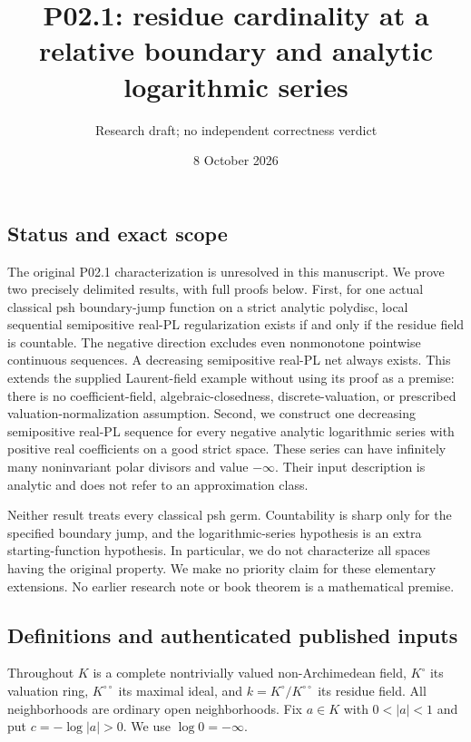 \documentclass[
  11pt,
]{article}
\title{P02.1: residue cardinality at a relative boundary and analytic
logarithmic series}
\author{Research draft; no independent correctness verdict}
\date{8 October 2026}
\begin{document}
\maketitle

\subsection{Status and exact scope}\label{status-and-exact-scope}

The original P02.1 characterization is unresolved in this manuscript. We
prove two precisely delimited results, with full proofs below. First,
for one actual classical psh boundary-jump function on a strict analytic
polydisc, local sequential semipositive real-PL regularization exists if
and only if the residue field is countable. The negative direction
excludes even nonmonotone pointwise continuous sequences. A decreasing
semipositive real-PL net always exists. This extends the supplied
Laurent-field example without using its proof as a premise: there is no
coefficient-field, algebraic-closedness, discrete-valuation, or
prescribed valuation-normalization assumption. Second, we construct one
decreasing semipositive real-PL sequence for every negative analytic
logarithmic series with positive real coefficients on a good strict
space. These series can have infinitely many noninvariant polar divisors
and value \(-\infty\). Their input description is analytic and does not
refer to an approximation class.

Neither result treats every classical psh germ. Countability is sharp
only for the specified boundary jump, and the logarithmic-series
hypothesis is an extra starting-function hypothesis. In particular, we
do not characterize all spaces having the original property. We make no
priority claim for these elementary extensions. No earlier research note
or book theorem is a mathematical premise.

\subsection{Definitions and authenticated published
inputs}\label{definitions-and-authenticated-published-inputs}

Throughout \(K\) is a complete nontrivially valued non-Archimedean
field, \(K^\circ\) its valuation ring, \(K^{\circ\circ}\) its maximal
ideal, and \(k=K^\circ/K^{\circ\circ}\) its residue field. All
neighborhoods are ordinary open neighborhoods. Fix \(a\in K\) with
\(0<|a|<1\) and put \(c=-\log|a|>0\). We use \(\log 0=-\infty\).
\end{document}
